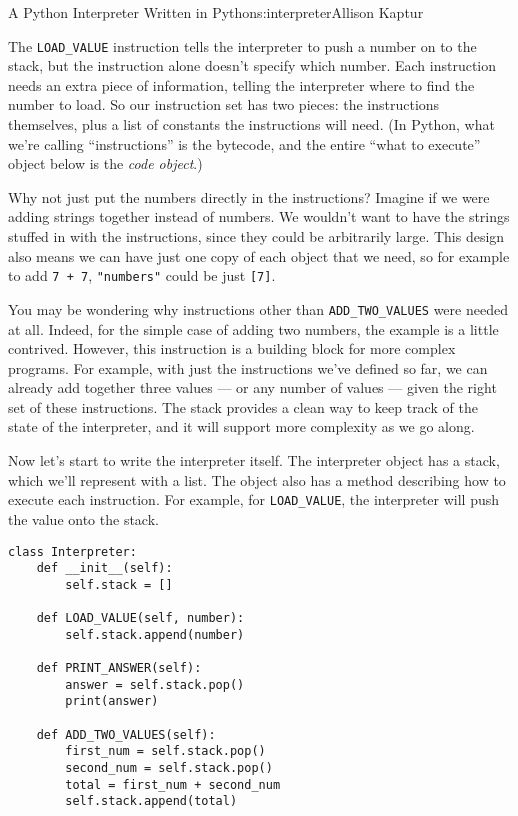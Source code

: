 \begin{aosachapter}{A Python Interpreter Written in Python}{s:interpreter}{Allison Kaptur}

The \texttt{LOAD\_VALUE} instruction tells the interpreter to push a
number on to the stack, but the instruction alone doesn't specify which
number. Each instruction needs an extra piece of information, telling
the interpreter where to find the number to load. So our instruction set
has two pieces: the instructions themselves, plus a list of constants
the instructions will need. (In Python, what we're calling
``instructions'' is the bytecode, and the entire ``what to execute''
object below is the \emph{code object}.)

Why not just put the numbers directly in the instructions? Imagine if we
were adding strings together instead of numbers. We wouldn't want to
have the strings stuffed in with the instructions, since they could be
arbitrarily large. This design also means we can have just one copy of
each object that we need, so for example to add \texttt{7 + 7},
\texttt{"numbers"} could be just \texttt{{[}7{]}}.

You may be wondering why instructions other than
\texttt{ADD\_TWO\_VALUES} were needed at all. Indeed, for the simple
case of adding two numbers, the example is a little contrived. However,
this instruction is a building block for more complex programs. For
example, with just the instructions we've defined so far, we can already
add together three values --- or any number of values --- given the
right set of these instructions. The stack provides a clean way to keep
track of the state of the interpreter, and it will support more
complexity as we go along.

Now let's start to write the interpreter itself. The interpreter object
has a stack, which we'll represent with a list. The object also has a
method describing how to execute each instruction. For example, for
\texttt{LOAD\_VALUE}, the interpreter will push the value onto the
stack.

\begin{verbatim}
class Interpreter:
    def __init__(self):
        self.stack = []

    def LOAD_VALUE(self, number):
        self.stack.append(number)

    def PRINT_ANSWER(self):
        answer = self.stack.pop()
        print(answer)

    def ADD_TWO_VALUES(self):
        first_num = self.stack.pop()
        second_num = self.stack.pop()
        total = first_num + second_num
        self.stack.append(total)
\end{verbatim}


\end{aosachapter}
